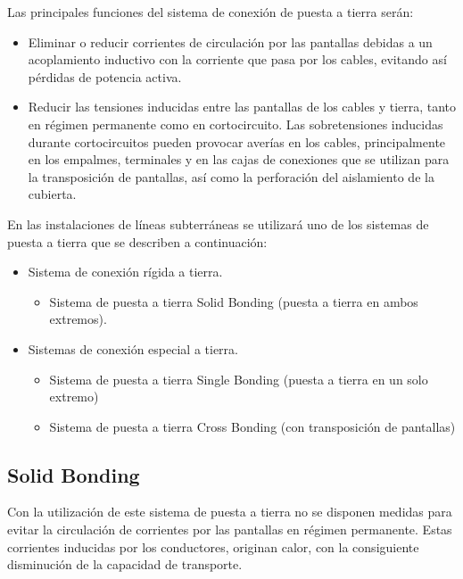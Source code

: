 \documentclass[10pt,a4paper]{article}
\begin{document}
Las principales funciones del sistema de conexión de puesta a tierra serán:
\begin{itemize}
    \item  Eliminar o reducir corrientes de circulación por las pantallas debidas a un acoplamiento inductivo con la corriente que pasa por los cables, evitando así pérdidas de potencia activa.
    \item Reducir las tensiones inducidas entre las pantallas de los cables y tierra, tanto en régimen permanente como en cortocircuito. Las sobretensiones inducidas durante cortocircuitos pueden provocar averías en los cables, principalmente en los empalmes, terminales y en las cajas de conexiones que se utilizan para la transposición de pantallas, así como la perforación del aislamiento de la cubierta.
\end{itemize}

En las instalaciones de líneas subterráneas se utilizará uno de los
sistemas de puesta a tierra que se describen a continuación:
\begin{itemize}
    \item Sistema de conexión rígida a tierra.\begin{itemize}
        \item Sistema de puesta a tierra Solid Bonding (puesta a tierra en ambos
extremos).
    \end{itemize}
    \item Sistemas de conexión especial a tierra. \begin{itemize}
        \item Sistema de puesta a tierra Single Bonding (puesta a tierra en un solo extremo)
        \item Sistema de puesta a tierra Cross Bonding (con transposición de
pantallas)
    \end{itemize}
\end{itemize}
\subsection{Solid Bonding}
Con la utilización de este sistema de puesta a tierra no se disponen medidas
para evitar la circulación de corrientes por las pantallas en régimen
permanente. Estas corrientes inducidas por los conductores, originan calor,
con la consiguiente disminución de la capacidad de transporte.
\\
\end{document}
